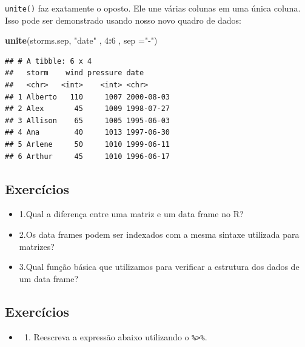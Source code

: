 \documentclass[]{book}
\newenvironment{Shaded}{\begin{snugshade}}{\end{snugshade}}
\newcommand{\DataTypeTok}[1]{\textcolor[rgb]{0.13,0.29,0.53}{#1}}
\newcommand{\DecValTok}[1]{\textcolor[rgb]{0.00,0.00,0.81}{#1}}
\newcommand{\KeywordTok}[1]{\textcolor[rgb]{0.13,0.29,0.53}{\textbf{#1}}}
\newcommand{\NormalTok}[1]{#1}
\newcommand{\OperatorTok}[1]{\textcolor[rgb]{0.81,0.36,0.00}{\textbf{#1}}}
\newcommand{\StringTok}[1]{\textcolor[rgb]{0.31,0.60,0.02}{#1}}
\providecommand{\tightlist}{%
  \setlength{\itemsep}{0pt}\setlength{\parskip}{0pt}}
\begin{document}
\texttt{unite()} faz exatamente o oposto. Ele une várias colunas em uma única coluna. Isso pode ser demonstrado usando nosso novo quadro de dados:

\begin{Shaded}
\begin{Highlighting}[]
\KeywordTok{unite}\NormalTok{(storms.sep, }\StringTok{"date"}\NormalTok{ , }\DecValTok{4}\OperatorTok{:}\DecValTok{6}\NormalTok{ , }\DataTypeTok{sep =}\StringTok{"-"}\NormalTok{)}
\end{Highlighting}
\end{Shaded}

\begin{verbatim}
## # A tibble: 6 x 4
##   storm    wind pressure date      
##   <chr>   <int>    <int> <chr>     
## 1 Alberto   110     1007 2000-08-03
## 2 Alex       45     1009 1998-07-27
## 3 Allison    65     1005 1995-06-03
## 4 Ana        40     1013 1997-06-30
## 5 Arlene     50     1010 1999-06-11
## 6 Arthur     45     1010 1996-06-17
\end{verbatim}

\hypertarget{exercuxedcios}{%
\subsection{Exercícios}\label{exercuxedcios}}

\begin{itemize}
\tightlist
\item
  1.Qual a diferença entre uma matriz e um data frame no R?
\item
  2.Os data frames podem ser indexados com a mesma sintaxe utilizada para matrizes?
\item
  3.Qual função básica que utilizamos para verificar a estrutura dos dados de um data frame?
\end{itemize}

\hypertarget{exercuxedcios-1}{%
\subsection{Exercícios}\label{exercuxedcios-1}}

\begin{itemize}
\item
  \begin{enumerate}
  \def\labelenumi{\arabic{enumi}.}
  \tightlist
  \item
    Reescreva a expressão abaixo utilizando o \texttt{\%\textgreater{}\%}.
  \end{enumerate}
\end{itemize}
\end{document}
